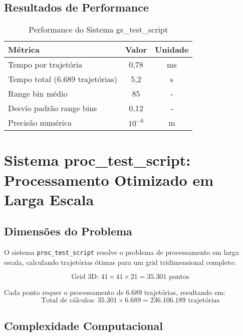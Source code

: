 \documentclass[12pt,a4paper]{article}
\begin{document}
\subsection{Resultados de Performance}

\begin{table}[H]
\centering
\caption{Performance do Sistema gs\_test\_script}
\begin{tabular}{@{}lcc@{}}
\toprule
\textbf{Métrica} & \textbf{Valor} & \textbf{Unidade} \\
\midrule
Tempo por trajetória & 0,78 & ms \\
Tempo total (6.689 trajetórias) & 5,2 & s \\
Range bin médio & 85 & - \\
Desvio padrão range bins & 0,12 & - \\
Precisão numérica & $10^{-6}$ & m \\
\bottomrule
\end{tabular}
\end{table}

\section{Sistema proc\_test\_script: Processamento Otimizado em Larga Escala}

\subsection{Dimensões do Problema}

O sistema \texttt{proc\_test\_script} resolve o problema de processamento em larga escala, calculando trajetórias ótimas para um grid tridimensional completo:

\begin{equation}
\text{Grid 3D: } 41 \times 41 \times 21 = 35.301 \text{ pontos}
\end{equation}

Cada ponto requer o processamento de 6.689 trajetórias, resultando em:
\begin{equation}
\text{Total de cálculos: } 35.301 \times 6.689 = 236.106.189 \text{ trajetórias}
\end{equation}

\subsection{Complexidade Computacional}
\end{document}

